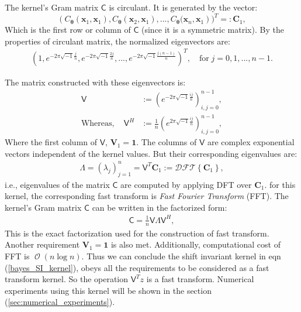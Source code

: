 \documentclass[twocolumn]{svjour3}          %
\DeclareMathOperator{\Order}{{\mathcal O}}
\newcommand{\bm}[1]{\boldsymbol{#1}}
\newcommand{\vtheta}{{\bm{\theta}}}
\newcommand{\vC}{\bm{C}}
\newcommand{\vV}{\bm{V}}
\newcommand{\vx}{\bm{x}}
\newcommand{\vCvtheta}{{C_\vtheta}}
\newcommand{\vone}{\bm{1}}
\newcommand{\mC}{\mathsf{C}}
\newcommand{\mLambda}{\mathsf{\Lambda}}
\newcommand{\mV}{\mathsf{V}}
\begin{document}
The kernel's Gram matrix $\mC$ is circulant. It is generated by the vector:
\begin{equation}
\label{eqn_top_row_of_kernel_matrix}
\left( \vCvtheta(\vx_1,\vx_1),\vCvtheta(\vx_2,\vx_1),...,\vCvtheta(\vx_{n},\vx_1 \right) 
)^T =: \vC_1,
\end{equation}
Which is the first row or column of $\mC$ (since it is a symmetric matrix).  By the properties of circulant matrix, the normalized eigenvectors are:
\begin{align*}
\left(
1, 
e^{- 2 \pi \sqrt{-1} \frac{j}{n}},
e^{- 2 \pi \sqrt{-1} \frac{2j}{n}}
,...,
e^{- 2 \pi \sqrt{-1} \frac{j(n-1)}{n}}  
\right)^T, \quad \text{for} \;
j=0,1,...,n-1 .
\end{align*}

The matrix constructed with these eigenvectors is: 
\begin{align*}
\mV  &:= \left(e^{- 2 \pi \sqrt{-1} \frac{i j}{n}} \right)_{i,j=0}^{n-1},
\\
\text{Whereas}, \quad
\mV^H &:= \frac{1}{n} \left(e^{ 2 \pi \sqrt{-1} \frac{i j}{n}} \right)_{i,j=0}^{n-1},
\end{align*}
Where the first column of $\mV$, $\vV_1 = \vone$.
The columns of $\mV$ are complex exponential vectors independent of the kernel values. But their corresponding eigenvalues are:
\begin{align*}
\mLambda = \left( \lambda_j \right)_{j=1}^{n} = \mV^T \vC_1 := \mathcal{DFT} \left\lbrace \vC_1 \right\rbrace,
\end{align*}
i.e., eigenvalues of the matrix $\mC$ are computed by applying DFT over $\vC_1$. 
for this kernel, the corresponding fast transform is \emph{Fast Fourier Transform} (FFT). 
The kernel's Gram matrix $\mC$ can be written in the factorized form:
\begin{align*}
\mC = \frac1n \mV \mLambda \mV^H,
\end{align*}
This is the exact factorization used for the construction of fast transform. 
Another requirement $\vV_1 = \vone$ is also met.
Additionally, computational cost of FFT is $\Order(n \log n)$.
Thus we can conclude the shift invariant kernel in eqn (\ref{bayes_SI_kernel}), obeys all the requirements to be considered as a {fast transform kernel}. So the operation $\mV^T z$ is a fast transform.
Numerical experiments using this kernel will be shown in the section (\ref{sec:numerical_experiments}).
\end{document}
